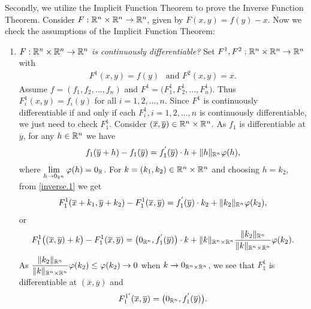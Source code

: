 \begin{problem}
\begin{solution}
\begin{enumerate}
    Secondly, we utilize the Implicit Function Theorem to prove the Inverse Function Theorem. Consider $F:\mathbb{R}^n \times \mathbb{R}^n \rightarrow \mathbb{R}^n$, given by $F(x,y)=f(y)-x$. Now we check the assumptions of the Implicit Function Theorem:
    \begin{enumerate}
        \item[i)] \textit{$F:\mathbb{R}^n \times \mathbb{R}^n \rightarrow \mathbb{R}^n$ is continuously differentiable?} Set $F^1, F^2: \mathbb{R}^n \times \mathbb{R}^n \rightarrow \mathbb{R}^n$ with 
        \begin{align*}
            F^1 (x,y) = f(y) \ \ \text{ and } F^2 (x,y) = x.
        \end{align*}
        Assume $f=(f_1,f_2,...,f_n)$ and $F^1 =\big( F^1_1, F^1_2,...,F^1_n \big)$. Thus $F^1_i (x,y) = f_i (y)$ for all $i=1,2,...,n$. Since $F^1$ is continuously differentiable if and only if each $F^1_i,i=1,2,...,n$ is continuously differentiable, we just need to check $F^1_1$. Consider $(\overline{x},\overline{y})\in \mathbb{R}^n \times \mathbb{R}^n$. As $f_1$ is differentiable at $\overline{y}$, for any $h\in\mathbb{R}^n$ we have
        \begin{align}\label{inverse.1}
            f_1(\overline{y}+h) - f_1(\overline{y}) = f_1^{'} (\overline{y}) \cdot h + \|h\|_{\mathbb{R}^n} \varphi(h),
        \end{align}
        where $\lim\limits_{h\rightarrow 0_{\mathbb{R}^n}}\varphi (h) =0_{\mathbb{R}}$.
        For $k=(k_1,k_2)\in \mathbb{R}^n \times \mathbb{R}^n$ and choosing $h=k_2$, from \eqref{inverse.1} we get
        \begin{align*}
            F^1_1 (\overline{x}+k_1, \overline{y}+k_2) - F^1_1 (\overline{x},\overline{y}) = f_1^{'} (\overline{y}) \cdot k_2 + \|k_2\|_{\mathbb{R}^n}  \varphi (k_2),
        \end{align*}
        or 
        \begin{align*}
            F^1_1 \big((\overline{x},\overline{y})+k\big) - F^1_1 (\overline{x},\overline{y}) = \big(0_{\mathbb{R}^n},f_1^{'} (\overline{y})\big) \cdot k + \|k\|_{\mathbb{R}^n \times \mathbb{R}^n} \dfrac{\|k_2\|_{\mathbb{R}^n}}{\|k\|_{\mathbb{R}^n \times \mathbb{R}^n}}  \varphi (k_2).
        \end{align*}
        As $\dfrac{\|k_2\|_{\mathbb{R}^n}}{\|k\|_{\mathbb{R}^n \times \mathbb{R}^n}}  \varphi (k_2) \le \varphi (k_2) \rightarrow 0$ when $k\rightarrow 0_{\mathbb{R}^n \times \mathbb{R}^n}$, we see that $F^1_1$ is differentiable at $(\overline{x},\overline{y})$ and 
        \begin{align*}
            F^{1'}_{1} (\overline{x},\overline{y}) = \big(0_{\mathbb{R}^n},f_1^{'} (\overline{y})\big).
        \end{align*}

\end{enumerate}
\end{enumerate}
\end{solution}
\end{problem}
